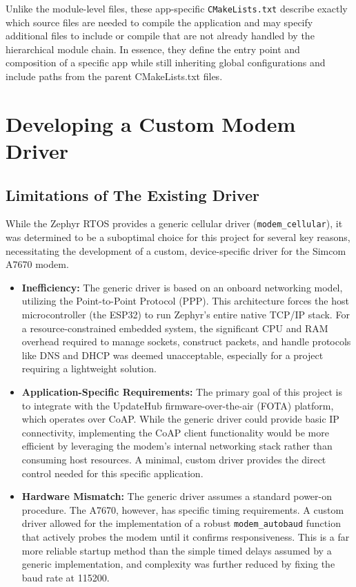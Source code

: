 Unlike the module-level files, these app-specific \texttt{CMakeLists.txt} describe exactly which source files are needed to compile the application and may specify additional files to include or compile that are not already handled by the hierarchical module chain. In essence, they define the entry point and composition of a specific app while still inheriting global configurations and include paths from the parent CMakeLists.txt files.


\section{Developing a Custom Modem Driver}

\subsection{Limitations of The Existing Driver}
While the Zephyr RTOS provides a generic cellular driver (\texttt{modem\_cellular}), it was determined to be a suboptimal choice for this project for several key reasons, necessitating the development of a custom, device-specific driver for the Simcom A7670 modem.

\begin{itemize}
    \item \textbf{Inefficiency:} The generic driver is based on an onboard networking model, utilizing the Point-to-Point Protocol (PPP). This architecture forces the host microcontroller (the ESP32) to run Zephyr's entire native TCP/IP stack. For a resource-constrained embedded system, the significant CPU and RAM overhead required to manage sockets, construct packets, and handle protocols like DNS and DHCP was deemed unacceptable, especially for a project requiring a lightweight solution.
    
    \item \textbf{Application-Specific Requirements:} The primary goal of this project is to integrate with the UpdateHub firmware-over-the-air (FOTA) platform, which operates over CoAP. While the generic driver could provide basic IP connectivity, implementing the CoAP client functionality would be more efficient by leveraging the modem's internal networking stack rather than consuming host resources. A minimal, custom driver provides the direct control needed for this specific application.

    \item \textbf{Hardware Mismatch:} The generic driver assumes a standard power-on procedure. The A7670, however, has specific timing requirements. A custom driver allowed for the implementation of a robust \texttt{modem\_autobaud} function that actively probes the modem until it confirms responsiveness. This is a far more reliable startup method than the simple timed delays assumed by a generic implementation, and complexity was further reduced by fixing the baud rate at 115200.
\end{itemize}

